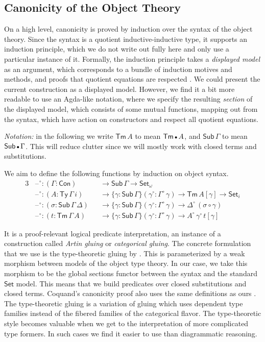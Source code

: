 \documentclass[acmsmall,screen,review,anonymous]{acmart}
\newcommand{\msf}[1]{{\mathsf{#1}}}
\newcommand{\Set}{\msf{Set}}
\newcommand{\blank}{{\mathord{\hspace{1pt}\text{--}\hspace{1pt}}}}
\newcommand{\emptycon}{\scaleobj{.75}\bullet}
\newcommand{\Con}{\msf{Con}}
\newcommand{\Sub}{\msf{Sub}}
\newcommand{\Ty}{\msf{Ty}}
\newcommand{\Tm}{\msf{Tm}}
\newcommand{\w}{\circ}
\begin{document}
\subsection{Canonicity of the Object Theory}\label{sec:canonicity-model}

On a high level, canonicity is proved by induction over the syntax of the object theory. Since the
syntax is a quotient inductive-inductive type, it supports an induction principle, which we do not
write out fully here and only use a particular instance of it. Formally, the induction principle
takes a \emph{displayed model} as an argument, which corresponds to a bundle of induction motives
and methods, and proofs that quotient equations are respected
\cite[Chapter~4]{DBLP:journals/corr/abs-2302-08837}. We could present the current construction as a
displayed model. However, we find it a bit more readable to use an Agda-like notation, where we
specify the resulting \emph{section} of the displayed model, which consists of some mutual
functions, mapping out from the syntax, which have action on constructors and respect all quotient
equations.

\emph{Notation:} in the following we write $\Tm\,A$ to mean $\Tm\,\emptycon\,A$, and
$\Sub\,\Gamma$ to mean $\Sub\,\emptycon\,\Gamma$. This will reduce clutter since we will mostly work
with closed terms and substitutions.

We aim to define the following functions by induction on object syntax.
\begin{alignat*}{3}
  &\blank^\w : (\Gamma : \Con)      && \to \Sub\,\Gamma \to \Set_\omega\\
  &\blank^\w : (A : \Ty\,\Gamma\,i) && \to \{\gamma : \Sub\,\Gamma\}(\gamma^\w : \Gamma^\w\,\gamma) \to \Tm\,A[\gamma] \to \Set_i\\
  &\blank^\w : (\sigma : \Sub\,\Gamma\,\Delta) && \to \{\gamma : \Sub\,\Gamma\}(\gamma^\w : \Gamma^\w\,\gamma) \to \Delta^\w\,(\sigma \circ \gamma)\\
  &\blank^\w : (t : \Tm\,\Gamma\,A) && \to \{\gamma : \Sub\,\Gamma\}(\gamma^\w : \Gamma^\w\,\gamma) \to A^\w\,\gamma^\w\,t[\gamma]
\end{alignat*}

It is a proof-relevant logical predicate interpretation, an instance of a construction called
\emph{Artin gluing} \cite[Exposé~4,~Section~9.5]{SGA4} or \emph{categorical gluing}. The concrete
formulation that we use is the type-theoretic gluing by \citet{gluing}. This is parameterized by a
weak morphism between models of the object type theory. In our case, we take this morphism to be the
global sections functor between the syntax and the standard $\Set$ model. This means that we build
predicates over closed substitutions and closed terms. Coquand's canonicity proof also uses the same
definitions as ours \cite{coquand2018canonicity}. The type-theoretic gluing is a variation of gluing
which uses dependent type families instead of the fibered families of the categorical flavor. The
type-theoretic style becomes valuable when we get to the interpretation of more complicated type
formers. In such cases we find it easier to use than diagrammatic reasoning.
\end{document}
